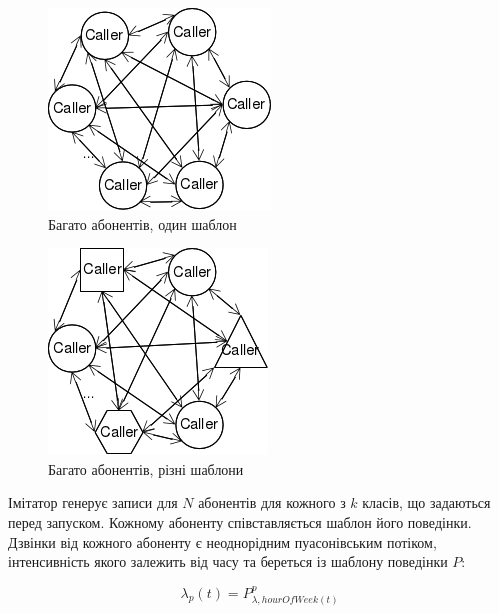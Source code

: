 \begin{figure}[h]
        \begin{center}
            \includegraphics[scale=0.8]{resources/imit-2.png}
        \end{center}
        \caption{Багато абонентів, один шаблон}
        \label{fig:imit-2}
\end{figure}

\begin{figure}[h]
        \begin{center}
            \includegraphics[scale=0.8]{resources/imit-3.png}
        \end{center}
        \caption{Багато абонентів, різні шаблони}
        \label{fig:imit-3}
\end{figure}

Імітатор генерує записи для $N$ абонентів для кожного з $k$ класів, що задаються перед запуском. Кожному абоненту співставляється шаблон його поведінки. Дзвінки від кожного абоненту є неоднорідним пуасонівським потіком, інтенсивність якого залежить від часу та береться із шаблону поведінки $P$:

\begin{equation}\label{eq:puasson}\lambda_p(t) = P^p_{\lambda, hourOfWeek(t)} \end{equation}

